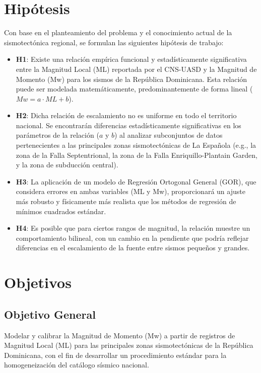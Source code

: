 \documentclass[12pt,a4paper]{article}
\begin{document}
\section{Hipótesis}
Con base en el planteamiento del problema y el conocimiento actual de la sismotectónica regional, se formulan las siguientes hipótesis de trabajo:
\begin{itemize}
    \item \textbf{H1}: Existe una relación empírica funcional y estadísticamente significativa entre la Magnitud Local (ML) reportada por el CNS-UASD y la Magnitud de Momento (Mw) para los sismos de la República Dominicana. Esta relación puede ser modelada matemáticamente, predominantemente de forma lineal ($Mw = a \cdot ML + b$).
    \item \textbf{H2}: Dicha relación de escalamiento no es uniforme en todo el territorio nacional. Se encontrarán diferencias estadísticamente significativas en los parámetros de la relación ($a$ y $b$) al analizar subconjuntos de datos pertenecientes a las principales zonas sismotectónicas de La Española (e.g., la zona de la Falla Septentrional, la zona de la Falla Enriquillo-Plantain Garden, y la zona de subducción central).
    \item \textbf{H3}: La aplicación de un modelo de Regresión Ortogonal General (GOR), que considera errores en ambas variables (ML y Mw), proporcionará un ajuste más robusto y físicamente más realista que los métodos de regresión de mínimos cuadrados estándar.
    \item \textbf{H4}: Es posible que para ciertos rangos de magnitud, la relación muestre un comportamiento bilineal, con un cambio en la pendiente que podría reflejar diferencias en el escalamiento de la fuente entre sismos pequeños y grandes.
\end{itemize}

\section{Objetivos}
\subsection{Objetivo General}
Modelar y calibrar la Magnitud de Momento (Mw) a partir de registros de Magnitud Local (ML) para las principales zonas sismotectónicas de la República Dominicana, con el fin de desarrollar un procedimiento estándar para la homogeneización del catálogo sísmico nacional.
\end{document}
